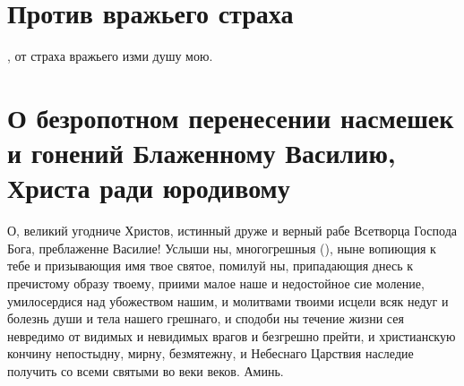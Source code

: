 \section{Против вражьего страха}

{, от страха вражьего изми душу мою.\par}

\section{О безропотном перенесении насмешек и гонений Блаженному Василию, Христа ради юродивому}\begin{mymulticols}
 

О, великий угодниче Христов, истинный друже и верный рабе Всетворца Господа Бога, преблаженне Василие! Услыши ны, многогрешныя (), ныне вопиющия к тебе и призывающия имя твое святое, помилуй ны, припадающия днесь к пречистому образу твоему, приими малое наше и недостойное сие моление, умилосердися над убожеством нашим, и молитвами твоими исцели всяк недуг и болезнь души и тела нашего грешнаго, и сподоби ны течение жизни сея невредимо от видимых и невидимых врагов и безгрешно прейти, и христианскую кончину непостыдну, мирну, безмятежну, и Небеснаго Царствия наследие получить со всеми святыми во веки веков. Аминь.

\end{mymulticols}


\mychapterending


 

